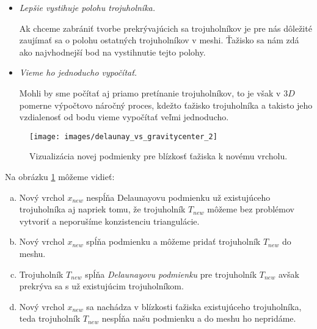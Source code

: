 \begin{enumerate}
{\begin{itemize}
{                Hlavný problém, prečo overovanie Delaunayovej podmienky pre všetky trojuholníky spôsobuje
                odmietanie aj vhodných trojuholníkov je ten, že stred opísanej kružnice nemusí byť vždy
                vnútri trojuholníka. Čím je trojuholník užší, tým je dokonca vzdialenejší a tak môže aj
                vzdialenejší úzky trojuholník spôsobiť nevzniknutie vhodného trojuholníka. 
            }
            \item{
                \textit{Lepšie vystihuje polohu trojuholníka.}

                Ak chceme zabrániť tvorbe prekrývajúcich sa trojuholníkov je pre nás dôležité zaujímať sa 
                o polohu ostatných trojuholníkov v meshi. Ťažisko sa nám zdá ako najvhodnejší bod na 
                vystihnutie tejto polohy.
            }
            \item{
                \textit{Vieme ho jednoducho vypočítať.}

                Mohli by sme počítať aj priamo pretínanie trojuholníkov, to je však v $3D$ pomerne 
                výpočtovo náročný proces, kdežto ťažisko trojuholníka a takisto jeho vzdialenosť od 
                bodu vieme vypočítať veľmi jednoducho.
            }
         \end{itemize}
         
         \begin{figure}
         \centerline{\texttt{[image: images/delaunay\_vs\_gravitycenter\_2]}}
         \caption[Nová podmienka pre blízkosť ťažiska k novému vrcholu]
         {Vizualizácia novej podmienky pre blízkosť ťažiska k novému vrcholu.}
         \label{obr:delaunay_vs_gravitycenter_2}
         \end{figure}
         
         Na obrázku \ref{obr:delaunay_vs_gravitycenter_2} môžeme vidieť:
         \begin{enumerate}[a)]
            \item{
                Nový vrchol $x_{new}$ nespĺňa Delaunayovu podmienku už existujúceho trojuholníka aj 
                napriek tomu, že trojuholník $T_{new}$ môžeme bez problémov vytvoriť a 
                neporušíme konzistenciu triangulácie.
            }
            \item{
                Nový vrchol $x_{new}$ spĺňa podmienku a môžeme pridať trojuholník $T_{new}$ do meshu.
            }
            \item{
                Trojuholník $T_{new}$ spĺňa \textit{Delaunayovu podmienku} pre trojuholník $T_{new}$ 
                avšak prekrýva sa s už existujúcim trojuholníkom.
            }
            \item{
                Nový vrchol $x_{new}$ sa nachádza v blízkosti ťažiska existujúceho trojuholníka, 
                teda trojuholník $T_{new}$ nespĺňa našu podmienku a do meshu ho nepridáme. 
            }
         \end{enumerate}


}
\end{enumerate}

